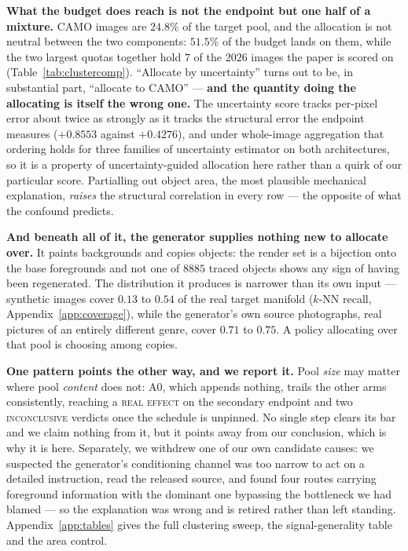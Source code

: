 \documentclass{article}
\begin{document}
\textbf{What the budget does reach is not the endpoint but one half of a mixture.} CAMO images are
$24.8\%$ of the target pool, and the allocation is not neutral between the two components: $51.5\%$
of the budget lands on them, while the two largest quotas together hold $7$ of the $2026$ images the
paper is scored on (Table~\ref{tab:clustercomp}). ``Allocate by uncertainty'' turns out to be, in substantial part, ``allocate
to CAMO'' --- \textbf{and the quantity doing the allocating is itself the wrong one.} The
uncertainty score tracks per-pixel error about twice as strongly as it tracks the structural error
the endpoint measures ($+0.8553$ against $+0.4276$), and under whole-image aggregation that ordering
holds for three families of uncertainty estimator on both architectures, so it is a property of uncertainty-guided allocation
here rather than a quirk of our particular score. Partialling out object area, the most plausible
mechanical explanation, \emph{raises} the structural correlation in every row --- the opposite of
what the confound predicts.

\textbf{And beneath all of it, the generator supplies nothing new to allocate over.} It paints
backgrounds and copies objects: the render set is a bijection onto the base foregrounds and not one
of $8885$ traced objects shows any sign of having been regenerated. The distribution it produces is
narrower than its own input --- synthetic images cover $0.13$ to $0.54$ of the real target manifold
($k$-NN recall, Appendix~\ref{app:coverage}), while the generator's own source photographs, real
pictures of an entirely different genre, cover $0.71$ to $0.75$. A policy allocating over that pool is choosing among copies.

\textbf{One pattern points the other way, and we report it.} Pool \emph{size} may matter where pool
\emph{content} does not: A0, which appends nothing, trails the other arms consistently, reaching a
\textsc{real effect} on the secondary endpoint and two \textsc{inconclusive} verdicts once the
schedule is unpinned. No single step clears its bar and we claim nothing from it, but it points away
from our conclusion, which is why it is here. Separately, we withdrew one of our own candidate
causes: we suspected the generator's conditioning channel was too narrow to act on a detailed
instruction, read the released source, and found four routes carrying foreground information with
the dominant one bypassing the bottleneck we had blamed --- so the explanation was wrong and is
retired rather than left standing. Appendix~\ref{app:tables} gives the full clustering sweep, the
signal-generality table and the area control.
\end{document}
